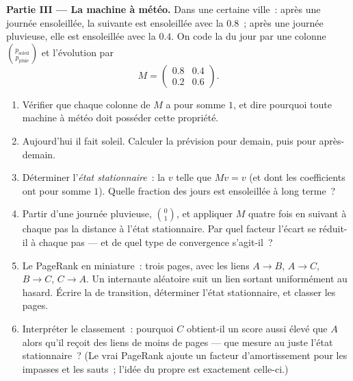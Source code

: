 \begin{problem}
\medskip
\noindent\textbf{Partie III --- La machine à météo.}
Dans une certaine ville~: après une journée ensoleillée, la suivante
est ensoleillée avec la  $0.8$~; après une journée
pluvieuse, elle est ensoleillée avec la  $0.4$. On code
la  du jour par une colonne
$\binom{p_{\text{soleil}}}{p_{\text{pluie}}}$ et l'évolution par
\[
M = \begin{pmatrix} 0.8 & 0.4\\ 0.2 & 0.6 \end{pmatrix}.
\]
\begin{enumerate}[resume]
  \item Vérifier que chaque colonne de $M$ a pour somme $1$, et
        dire pourquoi toute machine à météo doit posséder cette
        propriété.
  \item Aujourd'hui il fait soleil. Calculer la prévision pour
        demain, puis pour après-demain.
  \item Déterminer l'\emph{état stationnaire}~: la  $v$ telle
        que $Mv = v$ (et dont les coefficients ont pour somme $1$).
        Quelle fraction des jours est ensoleillée à long terme~?
  \item Partir d'une journée pluvieuse, $\binom01$, et appliquer
        $M$ quatre fois en suivant à chaque pas la distance à l'état
        stationnaire. Par quel facteur l'écart se réduit-il à chaque
        pas --- et de quel type de convergence s'agit-il~?
  \item Le PageRank en miniature~: trois pages, avec les liens
        $A \to B$, $A \to C$, $B \to C$, $C \to A$. Un internaute
        aléatoire suit un lien sortant uniformément au hasard.
        Écrire la  de transition, déterminer l'état
        stationnaire, et classer les pages.
  \item Interpréter le classement~: pourquoi $C$ obtient-il un
        score aussi élevé que $A$ alors qu'il reçoit des liens de
        moins de pages --- que mesure au juste l'état
        stationnaire~? (Le vrai PageRank ajoute un facteur
        d'amortissement pour les impasses et les sauts~; l'idée du
         propre est exactement celle-ci.)
\end{enumerate}


\end{problem}
